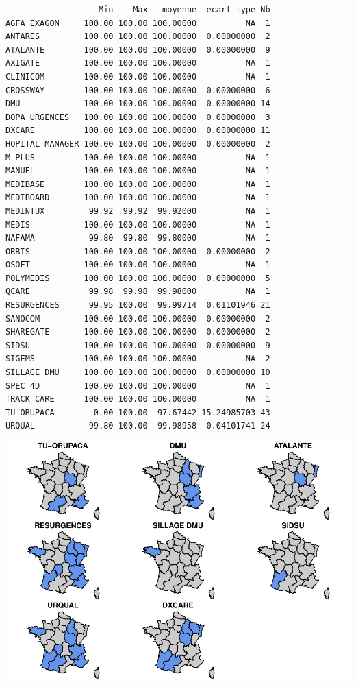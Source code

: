 \documentclass[]{article}
\begin{document}
\begin{verbatim}
                   Min    Max   moyenne  ecart-type Nb
AGFA EXAGON     100.00 100.00 100.00000          NA  1
ANTARES         100.00 100.00 100.00000  0.00000000  2
ATALANTE        100.00 100.00 100.00000  0.00000000  9
AXIGATE         100.00 100.00 100.00000          NA  1
CLINICOM        100.00 100.00 100.00000          NA  1
CROSSWAY        100.00 100.00 100.00000  0.00000000  6
DMU             100.00 100.00 100.00000  0.00000000 14
DOPA URGENCES   100.00 100.00 100.00000  0.00000000  3
DXCARE          100.00 100.00 100.00000  0.00000000 11
HOPITAL MANAGER 100.00 100.00 100.00000  0.00000000  2
M-PLUS          100.00 100.00 100.00000          NA  1
MANUEL          100.00 100.00 100.00000          NA  1
MEDIBASE        100.00 100.00 100.00000          NA  1
MEDIBOARD       100.00 100.00 100.00000          NA  1
MEDINTUX         99.92  99.92  99.92000          NA  1
MEDIS           100.00 100.00 100.00000          NA  1
NAFAMA           99.80  99.80  99.80000          NA  1
ORBIS           100.00 100.00 100.00000  0.00000000  2
OSOFT           100.00 100.00 100.00000          NA  1
POLYMEDIS       100.00 100.00 100.00000  0.00000000  5
QCARE            99.98  99.98  99.98000          NA  1
RESURGENCES      99.95 100.00  99.99714  0.01101946 21
SANOCOM         100.00 100.00 100.00000  0.00000000  2
SHAREGATE       100.00 100.00 100.00000  0.00000000  2
SIDSU           100.00 100.00 100.00000  0.00000000  9
SIGEMS          100.00 100.00 100.00000          NA  2
SILLAGE DMU     100.00 100.00 100.00000  0.00000000 10
SPEC 4D         100.00 100.00 100.00000          NA  1
TRACK CARE      100.00 100.00 100.00000          NA  1
TU-ORUPACA        0.00 100.00  97.67442 15.24985703 43
URQUAL           99.80 100.00  99.98958  0.04101741 24
\end{verbatim}

\includegraphics{septembre2015_files/figure-latex/unnamed-chunk-13-1.pdf}
\end{document}

